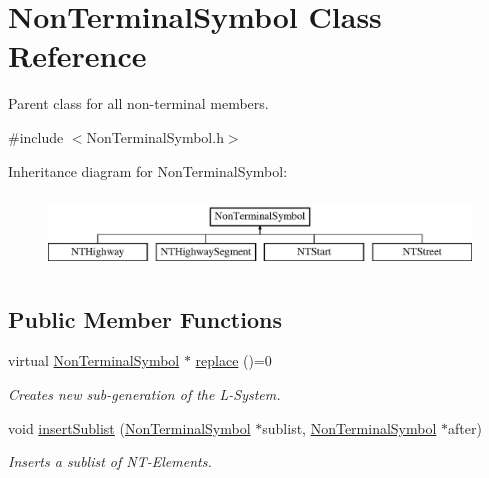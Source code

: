 \hypertarget{class_non_terminal_symbol}{}\section{Non\+Terminal\+Symbol Class Reference}
\label{class_non_terminal_symbol}


Parent class for all non-\/terminal members.  




{\ttfamily \#include $<$Non\+Terminal\+Symbol.\+h$>$}

Inheritance diagram for Non\+Terminal\+Symbol\+:\begin{figure}[H]
\begin{center}
\leavevmode
\includegraphics[height=2.000000cm]{class_non_terminal_symbol}
\end{center}
\end{figure}
\subsection*{Public Member Functions}
\begin{DoxyCompactItemize}
\item 
virtual \hyperlink{class_non_terminal_symbol}{Non\+Terminal\+Symbol} $\ast$ \hyperlink{class_non_terminal_symbol_ade38f1475002e4f8b41e23d9c787e5e0}{replace} ()=0
\begin{DoxyCompactList}\small\item\em Creates new sub-\/generation of the L-\/\+System. \end{DoxyCompactList}\item 
void \hyperlink{class_non_terminal_symbol_a5836ba5450850843721742e40064c5dc}{insert\+Sublist} (\hyperlink{class_non_terminal_symbol}{Non\+Terminal\+Symbol} $\ast$sublist, \hyperlink{class_non_terminal_symbol}{Non\+Terminal\+Symbol} $\ast$after)
\begin{DoxyCompactList}\small\item\em Inserts a sublist of N\+T-\/\+Elements. \end{DoxyCompactList}\end{DoxyCompactItemize}
